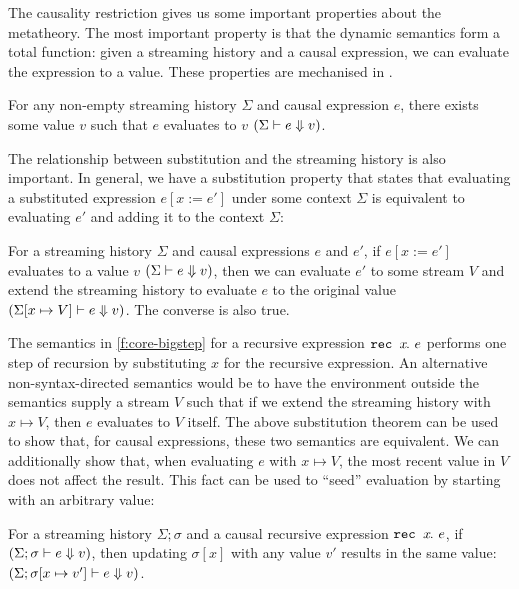 \documentclass[a4paper,UKenglish,cleveref, autoref, thm-restate,anonymous]{lipics-v2021}
\begin{document}
The causality restriction gives us some important properties about the metatheory.
The most important property is that the dynamic semantics form a total function: given a streaming history and a causal expression, we can evaluate the expression to a value.
These properties are mechanised in \fstar{}.



\begin{theorem}
  For any non-empty streaming history $\Sigma$ and causal expression $e$, there exists some value $v$ such that $e$ evaluates to $v$ $(\Sigma \vdash e \Downarrow v)$.
\end{theorem}

The relationship between substitution and the streaming history is also important.
In general, we have a substitution property that states that evaluating a substituted expression $e[x := e']$ under some context $\Sigma$ is equivalent to evaluating $e'$ and adding it to the context $\Sigma$:

\begin{theorem}
  For a streaming history $\Sigma$ and causal expressions $e$ and $e'$, if $e[x := e']$ evaluates to a value $v$ $(\Sigma \vdash e \Downarrow v)$, then we can evaluate $e'$ to some stream $V$ and extend the streaming history to evaluate $e$ to the original value $(\Sigma[x \mapsto V] \vdash e \Downarrow v)$.
  The converse is also true.
\end{theorem}



The semantics in \autoref{f:core-bigstep} for a recursive expression $\texttt{rec~} x\hspace{-0.1em}.~e$ performs one step of recursion by substituting $x$ for the recursive expression.
An alternative non-syntax-directed semantics would be to have the environment outside the semantics supply a stream $V$ such that if we extend the streaming history with $x \mapsto V$, then $e$ evaluates to $V$ itself.
The above substitution theorem can be used to show that, for causal expressions, these two semantics are equivalent.
We can additionally show that, when evaluating $e$ with $x \mapsto V$, the most recent value in $V$ does not affect the result.
This fact can be used to ``seed'' evaluation by starting with an arbitrary value:
\begin{theorem}
  For a streaming history $\Sigma; \sigma$ and a causal recursive expression $\texttt{rec~} x\hspace{-0.1em}.~e$, if $(\Sigma; \sigma \vdash e \Downarrow v)$, then updating $\sigma[x]$ with any value $v'$ results in the same value: $(\Sigma; \sigma[x \mapsto v'] \vdash e \Downarrow v)$.
\end{theorem}
\end{document}
